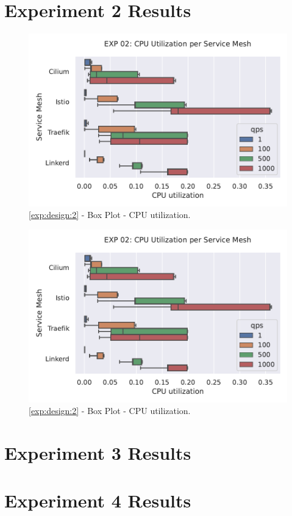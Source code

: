 \section{Experiment 2 Results}

\begin{figure}[h]
    \centering
    
    \includegraphics[width=\linewidth]{5_experimental_evaluation/figures/exp_02-cpu-boxplot.pdf}

    \caption{\ref{exp:design:2} - Box Plot - CPU utilization.}
    
    \label{fig:appendix:exp:result:02:cpu-boxplot}
\end{figure}

\begin{figure}[h]
    \centering
    
    \includegraphics[width=\linewidth]{5_experimental_evaluation/figures/exp_02-cpu-boxplot.pdf}

    \caption{\ref{exp:design:2} - Box Plot - CPU utilization.}
    
    \label{fig:appendix:exp:result:02:cpu-boxplot}
\end{figure}

\section{Experiment 3 Results}

\section{Experiment 4 Results}

